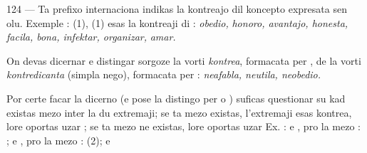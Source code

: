 \begin{VUpage}[128]{124}
 --- Ta prefixo internaciona indikas la kontreajo dil\nl
koncepto expresata sen olu. Exemple : \nl
{} (1), \nl
{} (1) esas la kontreaji di : \textit{obedio,}\nl
\textit{honoro, avantajo, honesta, facila, bona, infektar, organizar,}\nl
\textit{amar.}

On devas dicernar e distingar sorgoze la vorti \textit{kontrea},\nl
formacata per , de la vorti \textit{kontredicanta} (simpla nego),\nl
formacata per  : \textit{neafabla, neutila, neobedio.}

Por certe facar la dicerno (e pose la distingo per \nl
o ) suficas questionar su kad existas mezo inter la du\nl
extremaji; se ta mezo existas, l'extremaji esas kontrea, lore\nl
oportas uzar ; se ta mezo ne existas, lore oportas uzar\nl
{} Ex. :  e , pro la mezo : ; \nl
e , pro la mezo :  (2);  e \parplein
\end{VUpage}

